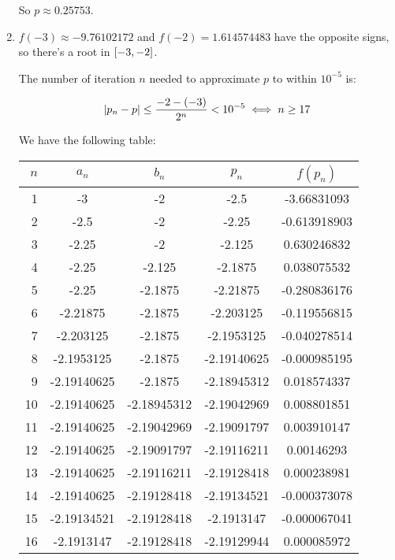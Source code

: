 \documentclass[../../Assignments.tex]{subfiles}
\begin{document}
\begin{solution}
\begin{enumerate}[label=(\alph*)]
            So \(p \approx \num{0.25753}\).

        \item \(f(-3) \approx \num{-9.76102172}\) and \(f(-2) =
            \num{1.614574483}\) have the opposite signs, so there's a root in
            \(\interval{-3}{-2}\).

            The number of iteration \(n\) needed to approximate \(p\) to within
            \(10^{-5}\) is:

            \[\abs{p_n - p} \leq \frac{-2 - (-3)}{2^n} < 10^{-5} \iff n \geq 17\]

            We have the following table:

            \begin{longtable}{r S[table-format=-1.8] S[table-format=-1.8] S[table-format=-1.8] S[table-format=-1.9]}
                \toprule
                \(n\)  &   {\(a_n\)}   &   {\(b_n\)}   &   {\(p_n\)}   &  {\(f(p_n)\)}  \\
                  &  -3           &  -2           &  -2.5         &  -3.66831093   \\
                    2  &  -2.5         &  -2           &  -2.25        &  -0.613918903  \\
                    3  &  -2.25        &  -2           &  -2.125       &   0.630246832  \\
                    4  &  -2.25        &  -2.125       &  -2.1875      &   0.038075532  \\
                    5  &  -2.25        &  -2.1875      &  -2.21875     &  -0.280836176  \\
                    6  &  -2.21875     &  -2.1875      &  -2.203125    &  -0.119556815  \\
                    7  &  -2.203125    &  -2.1875      &  -2.1953125   &  -0.040278514  \\
                    8  &  -2.1953125   &  -2.1875      &  -2.19140625  &  -0.000985195  \\
                    9  &  -2.19140625  &  -2.1875      &  -2.18945312  &   0.018574337  \\
                   10  &  -2.19140625  &  -2.18945312  &  -2.19042969  &   0.008801851  \\
                   11  &  -2.19140625  &  -2.19042969  &  -2.19091797  &   0.003910147  \\
                   12  &  -2.19140625  &  -2.19091797  &  -2.19116211  &   0.00146293   \\
                   13  &  -2.19140625  &  -2.19116211  &  -2.19128418  &   0.000238981  \\
                   14  &  -2.19140625  &  -2.19128418  &  -2.19134521  &  -0.000373078  \\
                   15  &  -2.19134521  &  -2.19128418  &  -2.1913147   &  -0.000067041  \\
                   16  &  -2.1913147   &  -2.19128418  &  -2.19129944  &   0.000085972  \\
                \bottomrule
            \end{longtable}


\end{enumerate}
\end{solution}
\end{document}
